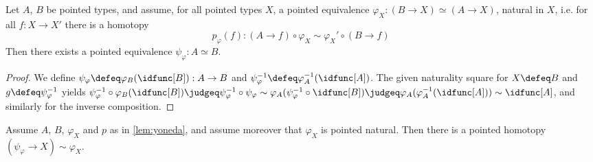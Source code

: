\documentclass{article}
\renewcommand{\phi}{\varphi}
\renewcommand{\o}{\ensuremath{\circ}}
\newcommand{\sy}{^{-1}}
\begin{document}
\begin{lem}[Yoneda]\label{lem:yoneda}
	Let $A$, $B$ be pointed types, and assume, for all pointed types $X$, a pointed equivalence $\phi_X : (B \to X) \simeq (A \to X)$, natural in $X$, i.e. for all $f : X \to X'$ there is a homotopy \[ p_\phi(f) : (A \to f) \o \phi_X \sim \phi_X' \o (B \to f) \]
	Then there exists a pointed equivalence $\psi_\phi : A \simeq B$.
\end{lem}
\begin{proof}
	We define $\psi_\phi \defeq \phi_B(\idfunc[B]) : A \to B$ and $\psi_\phi\sy \defeq \phi_A\sy(\idfunc[A])$. The given naturality square for $X \defeq B$ and $g \defeq \psi_\phi\sy$ yields $\psi_\phi\sy \o \phi_B (\idfunc[B]) \judgeq \psi_\phi\sy \o \psi_\phi \sim \phi_A (\psi_\phi\sy \o \idfunc[B]) \judgeq \phi_A (\phi_A\sy (\idfunc[A])) \sim \idfunc[A]$, and similarly for the inverse composition.
\end{proof}

\begin{lem}\label{lem:yoneda-pointed}
	Assume $A$, $B$, $\phi_X$ and $p$ as in \autoref{lem:yoneda}, and assume moreover that $\phi_X$ is pointed natural. Then there is a pointed homotopy $(\psi_\phi \to X) \sim \phi_X$.
\end{lem}
\end{document}
